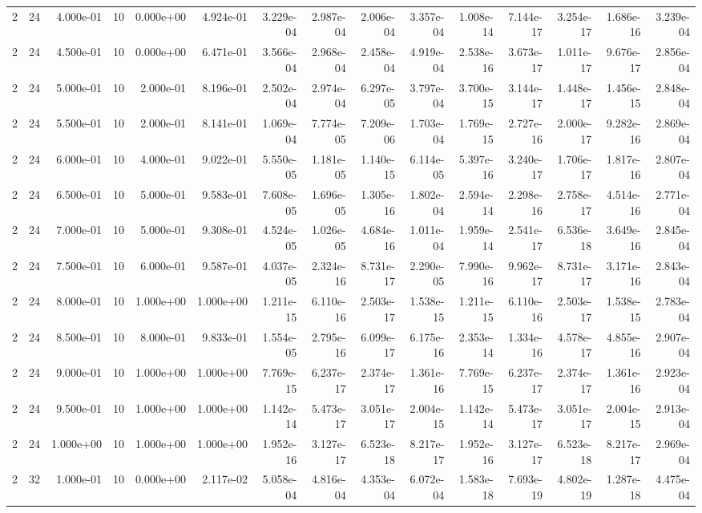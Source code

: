 \begin{tabular}{rrrrrrrrrrrrrrr}
2 & 24 & 4.000e-01 & 10 & 0.000e+00 & 4.924e-01 & 3.229e-04 & 2.987e-04 & 2.006e-04 & 3.357e-04 & 1.008e-14 & 7.144e-17 & 3.254e-17 & 1.686e-16 & 3.239e-04 \\
2 & 24 & 4.500e-01 & 10 & 0.000e+00 & 6.471e-01 & 3.566e-04 & 2.968e-04 & 2.458e-04 & 4.919e-04 & 2.538e-16 & 3.673e-17 & 1.011e-17 & 9.676e-17 & 2.856e-04 \\
2 & 24 & 5.000e-01 & 10 & 2.000e-01 & 8.196e-01 & 2.502e-04 & 2.974e-04 & 6.297e-05 & 3.797e-04 & 3.700e-15 & 3.144e-17 & 1.448e-17 & 1.456e-15 & 2.848e-04 \\
2 & 24 & 5.500e-01 & 10 & 2.000e-01 & 8.141e-01 & 1.069e-04 & 7.774e-05 & 7.209e-06 & 1.703e-04 & 1.769e-15 & 2.727e-16 & 2.000e-17 & 9.282e-16 & 2.869e-04 \\
2 & 24 & 6.000e-01 & 10 & 4.000e-01 & 9.022e-01 & 5.550e-05 & 1.181e-05 & 1.140e-15 & 6.114e-05 & 5.397e-16 & 3.240e-17 & 1.706e-17 & 1.817e-16 & 2.807e-04 \\
2 & 24 & 6.500e-01 & 10 & 5.000e-01 & 9.583e-01 & 7.608e-05 & 1.696e-05 & 1.305e-16 & 1.802e-04 & 2.594e-14 & 2.298e-16 & 2.758e-17 & 4.514e-16 & 2.771e-04 \\
2 & 24 & 7.000e-01 & 10 & 5.000e-01 & 9.308e-01 & 4.524e-05 & 1.026e-05 & 4.684e-16 & 1.011e-04 & 1.959e-14 & 2.541e-17 & 6.536e-18 & 3.649e-16 & 2.845e-04 \\
2 & 24 & 7.500e-01 & 10 & 6.000e-01 & 9.587e-01 & 4.037e-05 & 2.324e-16 & 8.731e-17 & 2.290e-05 & 7.990e-16 & 9.962e-17 & 8.731e-17 & 3.171e-16 & 2.843e-04 \\
2 & 24 & 8.000e-01 & 10 & 1.000e+00 & 1.000e+00 & 1.211e-15 & 6.110e-16 & 2.503e-17 & 1.538e-15 & 1.211e-15 & 6.110e-16 & 2.503e-17 & 1.538e-15 & 2.783e-04 \\
2 & 24 & 8.500e-01 & 10 & 8.000e-01 & 9.833e-01 & 1.554e-05 & 2.795e-16 & 6.099e-17 & 6.175e-16 & 2.353e-14 & 1.334e-16 & 4.578e-17 & 4.855e-16 & 2.907e-04 \\
2 & 24 & 9.000e-01 & 10 & 1.000e+00 & 1.000e+00 & 7.769e-15 & 6.237e-17 & 2.374e-17 & 1.361e-16 & 7.769e-15 & 6.237e-17 & 2.374e-17 & 1.361e-16 & 2.923e-04 \\
2 & 24 & 9.500e-01 & 10 & 1.000e+00 & 1.000e+00 & 1.142e-14 & 5.473e-17 & 3.051e-17 & 2.004e-15 & 1.142e-14 & 5.473e-17 & 3.051e-17 & 2.004e-15 & 2.913e-04 \\
2 & 24 & 1.000e+00 & 10 & 1.000e+00 & 1.000e+00 & 1.952e-16 & 3.127e-17 & 6.523e-18 & 8.217e-17 & 1.952e-16 & 3.127e-17 & 6.523e-18 & 8.217e-17 & 2.969e-04 \\
2 & 32 & 1.000e-01 & 10 & 0.000e+00 & 2.117e-02 & 5.058e-04 & 4.816e-04 & 4.353e-04 & 6.072e-04 & 1.583e-18 & 7.693e-19 & 4.802e-19 & 1.287e-18 & 4.475e-04 \\

\end{tabular}
